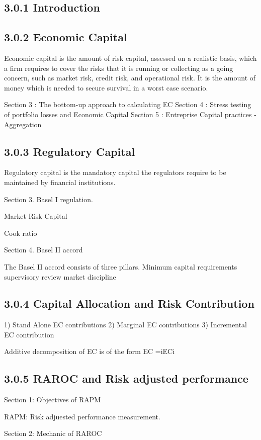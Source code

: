 \documentclass[]{report}
\begin{document}
\subsection{3.0.1 Introduction}


\subsection{3.0.2 Economic Capital}
Economic capital is the amount of risk capital, assessed on a realistic basis, which a firm requires to cover the risks that it is running or collecting as a going concern, such as market risk, credit risk, and operational risk. It is the amount of money which is needed to secure survival in a worst case scenario.

Section 3 : The bottom-up approach to calculating EC
Section 4 : Stress testing of portfolio losses and Economic Capital
Section 5 : Entreprise Capital practices - Aggregation

\subsection{3.0.3 Regulatory Capital}
Regulatory capital is the mandatory capital the regulators require to be maintained by financial institutions.

Section 3. Basel I regulation.

Market Risk Capital

Cook ratio

Section 4.  Basel II accord

The Basel II accord consists of three pillars.
Minimum capital requirements
supervisory review
market discipline
\subsection{3.0.4 Capital Allocation and Risk Contribution}

1) Stand Alone EC contributions
2) Marginal EC contributions
3) Incremental EC contribution

Additive decomposition of EC is of the form
	EC =iECi

\subsection*{3.0.5 RAROC and Risk adjusted performance}
Section 1: Objectives of RAPM

RAPM: Risk adjuested performance measurement.

Section 2:  Mechanic of RAROC
\end{document}
